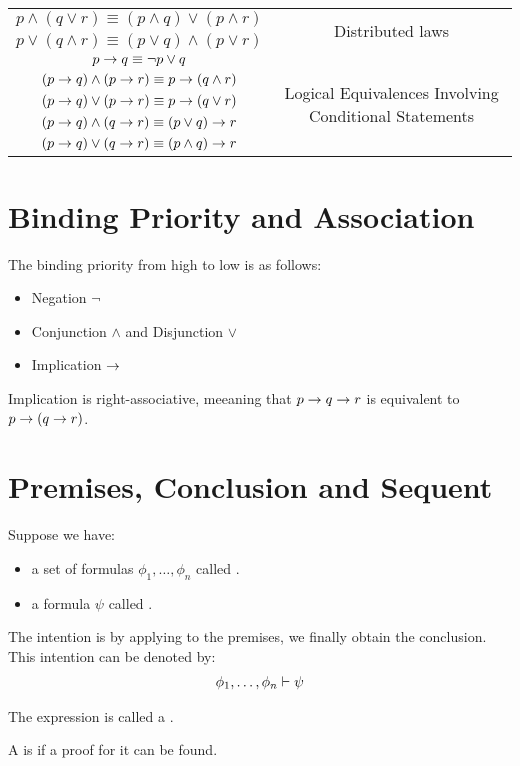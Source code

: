 \begin{center}
\begin{tabular}{|c|c|}
        $p \land (q \lor r) \equiv (p \land q) \lor (p \land r)$
          & \multirow{2}{*}{Distributed laws} \\
        $p \lor (q \land r) \equiv (p \lor q) \land (p \lor r)$ & \\
        \hline

        $p \rightarrow q \equiv \lnot p \lor q$
        & \multirow{5}{*}{Logical Equivalences Involving Conditional Statements} \\
        $(p \rightarrow q) \land (p \rightarrow r) \equiv p \rightarrow (q \land r)$
        & \\
        $(p \rightarrow q) \lor (p \rightarrow r) \equiv p \rightarrow (q \lor r)$
        & \\
        $(p \rightarrow q) \land (q \rightarrow r) \equiv (p \lor q) \rightarrow r$
        & \\
        $(p \rightarrow q) \lor (q \rightarrow r) \equiv (p \land q) \rightarrow r$
        & \\
        \hline
      \end{tabular}
    \end{center}

\section{Binding Priority and Association}
  \par The binding priority from high to low is as follows:
    \begin{itemize}
      \item Negation $\lnot$
      \item Conjunction $\land$ and Disjunction $\lor$
      \item Implication $\rightarrow$
    \end{itemize}
  \par Implication is right-associative, meeaning that $p \rightarrow q \rightarrow r$ is equivalent to $p \rightarrow (q \rightarrow r)$.

\section{Premises, Conclusion and Sequent}
    \par Suppose we have:
    \begin{itemize}
      \item a set of formulas $\phi_1, \ldots, \phi_n$ called .
      \item a formula $\psi$ called .
    \end{itemize}
    \par The intention is by applying  to the premises, we finally obtain the conclusion. This intention can be denoted by:
    \begin{align*}
      \phi_1, \ldots, \phi_n \vdash \psi
    \end{align*}
    \par The expression is called a .
    \par A  is  if a proof for it can be found.

